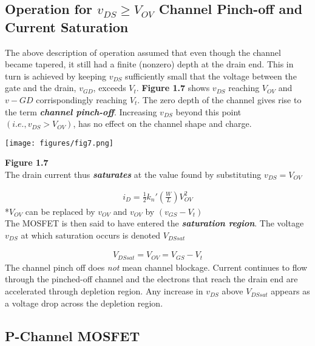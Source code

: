 \documentclass[12pt]{article}
\begin{document}
    \subsection*{Operation for $v_{DS} \geq V_{OV}$ Channel Pinch-off and Current Saturation}

    The above description of operation assumed that even though the channel became
    tapered, it still had a finite (nonzero) depth at the drain end. This in turn is achieved 
    by keeping $v_{DS}$ sufficiently small that the voltage between the gate and the drain, 
    $v_{GD}$, exceeds $V_t$. \textbf{Figure 1.7} shows $v_{DS}$ reaching $V_{OV}$ and $v-{GD}$ 
    corrispondingly reaching $V_t$. The zero depth of the channel gives rise to the term 
    \textit{\textbf{channel pinch-off}}. Increasing $v_{DS}$ beyond this point 
    $(i.e., v_{DS} > V_{OV})$, has no effect on the channel shape and charge.

    \begin{center}
        \texttt{[image: figures/fig7.png]}
    \end{center}
    \textbf{Figure 1.7}\\
    The drain current thus \textit{\textbf{saturates}} at the value found by substituting 
    $v_{DS} = V_{OV}$

    \begin{align}
        i_D = \frac{1}{2}k_n'\left(\frac{W}{L}\right)V^2_{OV}
    \end{align}
    *$V_{OV}$ can be replaced by $v_{OV}$ and $v_{OV}$ by $(v_{GS}-V_t)$\\[\baselineskip]
    The MOSFET is then said to have entered the \textit{\textbf{saturation region}}. The voltage 
    $v_{DS}$ at which saturation occurs is denoted $V_{DSsat}$

    \begin{align}
        V_{DSsat} = V_{OV} = V_{GS} - V_t
    \end{align}
    The channel pinch off does \textit{not} mean channel blockage. Current continues to flow
    through the pinched-off channel and the electrons that reach the drain end are 
    accelerated through depletion region. Any increase in $v_{DS}$ above $V_{DSsat}$ appears as 
    a voltage drop across the depletion region.  

    \subsection*{P-Channel MOSFET}
\end{document}
